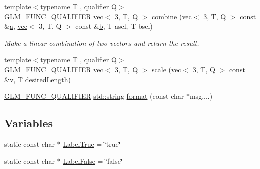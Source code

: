 \begin{DoxyCompactItemize}
\item 
{\footnotesize template$<$typename T , qualifier Q$>$ }\\\mbox{\hyperlink{setup_8hpp_a33fdea6f91c5f834105f7415e2a64407}{G\+L\+M\+\_\+\+F\+U\+N\+C\+\_\+\+Q\+U\+A\+L\+I\+F\+I\+ER}} \mbox{\hyperlink{structglm_1_1vec}{vec}}$<$ 3, T, Q $>$ \mbox{\hyperlink{namespaceglm_1_1detail_a62c6df7a0862562560f4ff00b215f4e6}{combine}} (\mbox{\hyperlink{structglm_1_1vec}{vec}}$<$ 3, T, Q $>$ const \&\mbox{\hyperlink{_s_d_l__opengl__glext_8h_a3309789fc188587d666cda5ece79cf82}{a}}, \mbox{\hyperlink{structglm_1_1vec}{vec}}$<$ 3, T, Q $>$ const \&\mbox{\hyperlink{_s_d_l__opengl__glext_8h_a0f71581a41fd2264c8944126dabbd010}{b}}, T ascl, T bscl)
\begin{DoxyCompactList}\small\item\em Make a linear combination of two vectors and return the result. \end{DoxyCompactList}\item 
{\footnotesize template$<$typename T , qualifier Q$>$ }\\\mbox{\hyperlink{setup_8hpp_a33fdea6f91c5f834105f7415e2a64407}{G\+L\+M\+\_\+\+F\+U\+N\+C\+\_\+\+Q\+U\+A\+L\+I\+F\+I\+ER}} \mbox{\hyperlink{structglm_1_1vec}{vec}}$<$ 3, T, Q $>$ \mbox{\hyperlink{namespaceglm_1_1detail_ab5e74c51452215027ae64d0ef1731f9c}{scale}} (\mbox{\hyperlink{structglm_1_1vec}{vec}}$<$ 3, T, Q $>$ const \&\mbox{\hyperlink{_s_d_l__opengl_8h_a10a82eabcb59d2fcd74acee063775f90}{v}}, T desired\+Length)
\item 
\mbox{\hyperlink{setup_8hpp_a33fdea6f91c5f834105f7415e2a64407}{G\+L\+M\+\_\+\+F\+U\+N\+C\+\_\+\+Q\+U\+A\+L\+I\+F\+I\+ER}} \mbox{\hyperlink{_s_d_l__opengl__glext_8h_ae84541b4f3d8e1ea24ec0f466a8c568b}{std\+::string}} \mbox{\hyperlink{namespaceglm_1_1detail_acd5305bbd1c5417b1eb770faf8229d14}{format}} (const char $\ast$msg,...)
\end{DoxyCompactItemize}
\subsection*{Variables}
\begin{DoxyCompactItemize}
\item 
static const char $\ast$ \mbox{\hyperlink{namespaceglm_1_1detail_acbf3b3879c4dca6a03fa14892e0beb85}{Label\+True}} = \char`\"{}true\char`\"{}
\item 
static const char $\ast$ \mbox{\hyperlink{namespaceglm_1_1detail_a9af06cfdb4ef874dc5c30348835bc549}{Label\+False}} = \char`\"{}false\char`\"{}
\end{DoxyCompactItemize}


